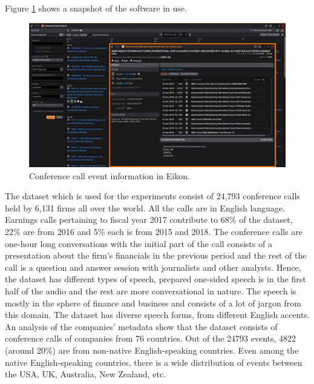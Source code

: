 Figure \ref{fig:eikon} shows a snapshot of the software in use.

\begin{figure}[ht]
  \begin{center}
    \includegraphics[width=\textwidth]{images/company-events-coverage-eikon.jpg} 
    \caption{Conference call event information in Eikon.}
    \label{fig:eikon}
  \end{center}
\end{figure}

The dataset which is used for the experiments consist of 24,793 conference calls held by 6,131 firms all over the world. All the calls are in English language. Earnings calls pertaining to fiscal year 2017 contribute to 68\% of the dataset, 22\% are from 2016 and 5\% each is from 2015 and 2018. 
The conference calls are one-hour long conversations with the initial part of the call consists of a presentation about the firm's financials in the previous period and the rest of the call is a question and answer session with journalists and other analysts. Hence, the dataset has different types of speech, prepared one-sided speech is in the first half of the audio and the rest are more conversational in nature. The speech is mostly in the sphere of finance and business and consists of a lot of jargon from this domain. The dataset has diverse speech forms, from different English accents. An analysis of the companies' metadata show that the dataset consists of conference calls of companies from 76 countries. Out of the 24793 events, 4822 (around 20\%) are from non-native English-speaking countries. Even among the native English-speaking countries, there is a wide distribution of events between the USA, UK, Australia, New Zealand, etc.


